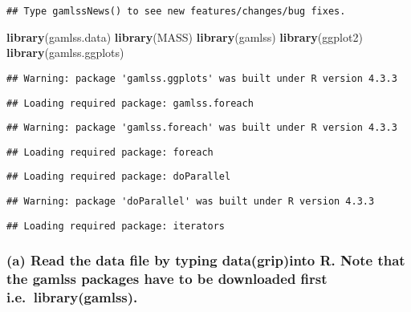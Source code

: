 \documentclass[
]{article}
\newenvironment{Shaded}{\begin{snugshade}}{\end{snugshade}}
\newcommand{\FunctionTok}[1]{\textcolor[rgb]{0.13,0.29,0.53}{\textbf{#1}}}
\newcommand{\NormalTok}[1]{#1}
\begin{document}
\begin{verbatim}
## Type gamlssNews() to see new features/changes/bug fixes.
\end{verbatim}

\begin{Shaded}
\begin{Highlighting}[]
\FunctionTok{library}\NormalTok{(gamlss.data)}
\FunctionTok{library}\NormalTok{(MASS)}
\FunctionTok{library}\NormalTok{(gamlss)}
\FunctionTok{library}\NormalTok{(ggplot2)}
\FunctionTok{library}\NormalTok{(gamlss.ggplots)}
\end{Highlighting}
\end{Shaded}

\begin{verbatim}
## Warning: package 'gamlss.ggplots' was built under R version 4.3.3
\end{verbatim}

\begin{verbatim}
## Loading required package: gamlss.foreach
\end{verbatim}

\begin{verbatim}
## Warning: package 'gamlss.foreach' was built under R version 4.3.3
\end{verbatim}

\begin{verbatim}
## Loading required package: foreach
\end{verbatim}

\begin{verbatim}
## Loading required package: doParallel
\end{verbatim}

\begin{verbatim}
## Warning: package 'doParallel' was built under R version 4.3.3
\end{verbatim}

\begin{verbatim}
## Loading required package: iterators
\end{verbatim}

\hypertarget{a-read-the-data-file-by-typing-datagripinto-r.-note-that-the-gamlss-packages-have-to-be-downloaded-first-i.e.-librarygamlss.}{%
\subsubsection{(a) Read the data file by typing data(grip)into R. Note
that the gamlss packages have to be downloaded first
i.e.~library(gamlss).}\label{a-read-the-data-file-by-typing-datagripinto-r.-note-that-the-gamlss-packages-have-to-be-downloaded-first-i.e.-librarygamlss.}}
\end{document}
